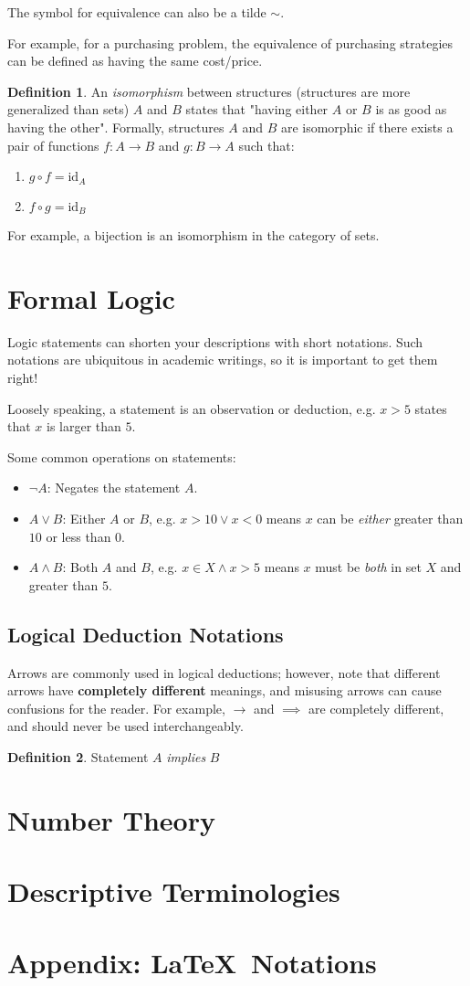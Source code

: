 \documentclass[12pt]{article}
\theoremstyle{definition}
\newtheorem{defn}{Definition}[section]
\newcommand{\id}[1]{\text{id}_{#1}}
\begin{document}
 	The symbol for equivalence can also be a tilde $\sim$.
 	
 	For example, for a purchasing problem, the equivalence of purchasing strategies can be defined as having the same cost/price.
 	
 	\begin{defn}
 		An \emph{isomorphism} between structures (structures are more generalized than sets) $A$ and $B$ states that "having either $A$ or $B$ is as good as having the other". Formally, structures $A$ and $B$ are isomorphic if there exists a pair of functions $f : A \to B$ and $g : B \to A$ such that:
 		\begin{enumerate}
 			\item $g \circ f = \id{A}$
 			\item $f \circ g = \id{B}$
 		\end{enumerate}
 	\end{defn}
 	
 	For example, a bijection is an isomorphism in the category of sets.
 	
 	\section{Formal Logic}
 	
 	Logic statements can shorten your descriptions with short notations. Such notations are ubiquitous in academic writings, so it is important to get them right!
 	
 	Loosely speaking, a statement is an observation or deduction, e.g. $x > 5$ states that $x$ is larger than $5$.
 	
 	Some common operations on statements:
 	\begin{itemize}
 		\item $\lnot A$: Negates the statement $A$.
 		\item $A \lor B$: Either $A$ or $B$, e.g. $x > 10 \lor x < 0$ means $x$ can be \emph{either} greater than $10$ or less than $0$.
 		\item $A \land B$: Both $A$ and $B$, e.g. $x \in X \land x > 5$ means $x$ must be \emph{both} in set $X$ and greater than $5$.
 	\end{itemize}
 	
 	\subsection{Logical Deduction Notations}
 	
 	Arrows are commonly used in logical deductions; however, note that different arrows have \textbf{completely different} meanings, and misusing arrows can cause confusions for the reader. For example, $\to$ and $\implies$ are completely different, and should never be used interchangeably.
 	
 	\begin{defn}
 		Statement $A$ \emph{implies} $B$
  	\end{defn}
 	
 	\section{Number Theory}
 	\section{Descriptive Terminologies}
 	\section{Appendix: \LaTeX\ Notations}
	
\end{document}
